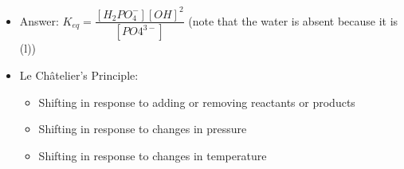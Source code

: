 \documentclass[12pt, letterpaper]{memoir}
\begin{document}
\begin{itemize}
		\item Answer: $K_{eq}=\dfrac{[H_2PO_4^{-}][OH]^2}{[PO4^{3-}]}$ (note that the water is absent because it is (l))
		\item Le Ch\^atelier's Principle:
		\begin{itemize}
			\item Shifting in response to adding or removing reactants or products
			\item Shifting in response to changes in pressure
			\item Shifting in response to changes in temperature
		\end{itemize}
	\end{itemize}
	
	
\end{document}
